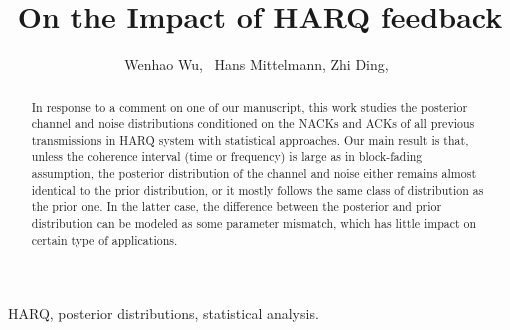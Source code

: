 \documentclass[journal,draftcls,onecolumn,12pt,twoside]{IEEEtran}
\begin{document}
%
\title{On the Impact of HARQ feedback}
%
%
%

\author{
  Wenhao Wu,~
  Hans Mittelmann,
  Zhi Ding,~
}

\maketitle

\begin{abstract}
  In response to a comment on one of our manuscript, this work studies the
  posterior channel and noise distributions conditioned on the NACKs and ACKs of
  all previous transmissions in HARQ system with statistical approaches. Our main
  result is that, unless the coherence interval (time or frequency) is large as
  in block-fading assumption, the posterior distribution of the channel and
  noise either remains almost identical to the prior distribution, or it mostly
  follows the same class of distribution as the prior one. In the latter case,
  the difference between the posterior and prior distribution can be modeled as
  some parameter mismatch, which has little impact on certain type of
  applications.
\end{abstract}

\begin{IEEEkeywords}
  HARQ, posterior distributions, statistical analysis.
\end{IEEEkeywords}
\end{document}
